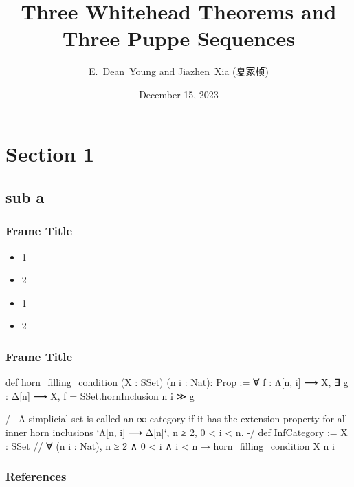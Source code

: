 \documentclass{beamer}
\title{Three Whitehead Theorems and Three Puppe Sequences}
\author{E.~Dean~Young and Jiazhen~Xia (夏家桢)}
\date{December 15, 2023}
\begin{document}
\begin{frame}
\titlepage
\end{frame}


\section{Section 1}
\subsection{sub a}

\begin{frame}
\frametitle{Frame Title}
\begin{itemize}
	\item 1
	\item 2
\end{itemize}
\medskip
\begin{itemize}
	\item 1
	\item 2
\end{itemize}
\end{frame}


\begin{frame}[fragile] %
\frametitle{Frame Title}
  \begin{leancode}
  def horn_filling_condition (X : SSet) (n i : Nat): Prop :=
    ∀ f : Λ[n, i] ⟶ X, ∃ g : Δ[n] ⟶ X,
    f = SSet.hornInclusion n i ≫ g
  
  /-- A simplicial set is called an ∞-category
  if it has the extension property for all inner horn inclusions
  `Λ[n, i] ⟶ Δ[n]`, n ≥ 2, 0 < i < n. -/
  def InfCategory := {X : SSet //
    ∀ (n i : Nat),
    n ≥ 2 ∧ 0 < i ∧ i < n → horn_filling_condition X n i}
  \end{leancode}
\end{frame}


\begin{frame}[allowframebreaks]
	\nocite{*}
       \frametitle{References}
\end{frame}


\end{document}
